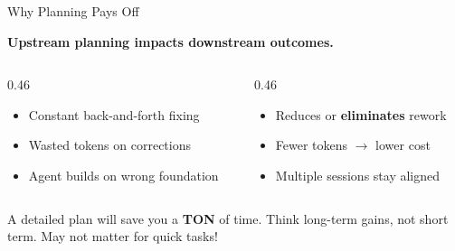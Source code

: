 \documentclass[aspectratio=169, 10pt]{beamer}
\begin{document}
\begin{frame}{Why Planning Pays Off}
\centering
\vskip2pt
\begin{tcolorbox}[accentbox, width=12cm, halign=center, top=3pt, bottom=3pt]
\normalsize\bfseries Upstream planning impacts downstream outcomes.
\end{tcolorbox}
\vskip6pt
\begin{columns}[T]
\begin{column}{0.46\textwidth}
\begin{tcolorbox}[keybox, title={Without a plan}]
\small
\begin{itemize}\setlength{\itemsep}{1pt}
  \item Constant back-and-forth fixing
  \item Wasted tokens on corrections
  \item Agent builds on wrong foundation
\end{itemize}
\end{tcolorbox}
\end{column}
\begin{column}{0.46\textwidth}
\begin{tcolorbox}[keybox, title={With a detailed plan}]
\small
\begin{itemize}\setlength{\itemsep}{1pt}
  \item Reduces or \textbf{eliminates} rework
  \item Fewer tokens $\rightarrow$ lower cost
  \item Multiple sessions stay aligned
\end{itemize}
\end{tcolorbox}
\end{column}
\end{columns}
\vskip6pt
\pause
\begin{tcolorbox}[quotebox, width=11cm]
\small A detailed plan will save you a \textbf{TON} of time. Think long-term gains, not short term. May not matter for quick tasks!
\end{tcolorbox}
\end{frame}
\end{document}

